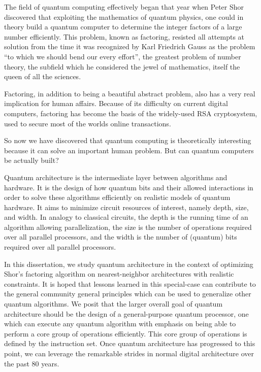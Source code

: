The field of quantum computing effectively began that year when Peter Shor discovered that exploiting the mathematics of quantum physics, one could in theory build a quantum computer to determine the integer factors of a large number efficiently. This problem, known as factoring, resisted all attempts at solution from the time it was recognized by Karl Friedrich Gauss as the
problem ``to which we should bend our every effort'', the greatest problem of number theory, the subfield which he considered the jewel of mathematics, itself the queen of all the sciences.

Factoring, in addition to being a beautiful abstract problem, also has a very real implication for human affairs. Because of its difficulty on current digital computers, factoring has become the basis of the widely-used RSA cryptosystem, used to secure most of the worlds online transactions.

So now we have discovered that quantum computing is theoretically interesting because it can solve an important human problem. But can quantum computers be actually built?

Quantum architecture is the intermediate layer between algorithms and hardware.
It is the design of how quantum bits and their allowed interactions in order to solve these algorithms efficiently on realistic models of quantum hardware.
It aims to minimize circuit resources of interest, namely depth, size, and width. In analogy to classical circuits, the depth is the running time of an algorithm allowing parallelization, the size is the number of operations required over all parallel processors, and the width is the number of (quantum) bits required over all parallel processors.

In this dissertation, we study quantum architecture in the context of optimizing Shor's factoring algorithm on nearest-neighbor architectures with realistic constraints. It is hoped that lessons learned in this special-case can contribute to the general community general principles which can be used to generalize other quantum algorithms. We posit that the larger overall goal of quantum architecture should be the design of a general-purpose quantum processor, one which can execute any quantum algorithm with emphasis on being able to perform a core group of operations efficiently. This core group of operations is defined by the instruction set. Once quantum architecture has progressed to this point, we can leverage the remarkable strides in normal digital architecture over the past 80 years.

